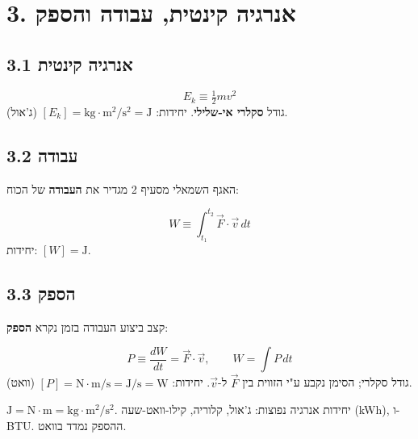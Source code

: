 \documentclass[12pt, a4paper]{article}
\newcommand{\hvec}[1]{\overrightarrow{#1}}
\begin{document}
\section*{3. אנרגיה קינטית, עבודה והספק}

\subsection*{3.1 אנרגיה קינטית}

\begin{tcolorbox}[defbox, title={אנרגיה קינטית (\textenglish{Kinetic Energy})}]
\[
  E_k \equiv \tfrac{1}{2}m v^2
\]
גודל \textbf{סקלרי אי-שלילי}. יחידות: \textenglish{$[E_k] = \text{kg}\cdot\text{m}^2/\text{s}^2 = \text{J}$} (ג'אול).
\end{tcolorbox}

\subsection*{3.2 עבודה}

האגף השמאלי מסעיף 2 מגדיר את \textbf{העבודה} של הכוח:

\begin{tcolorbox}[defbox, title={עבודה (\textenglish{Work})}]
\[
  W \equiv \int_{t_1}^{t_2}\hvec{F}\cdot\hvec{v}\,dt
\]
יחידות: \textenglish{$[W] = \text{J}$}.
\end{tcolorbox}

\subsection*{3.3 הספק}

קצב ביצוע העבודה בזמן נקרא \textbf{הספק}:

\begin{tcolorbox}[defbox, title={הספק (\textenglish{Power})}]
\[
  P \equiv \frac{dW}{dt} = \hvec{F}\cdot\hvec{v},
  \qquad
  W = \int P\,dt
\]
גודל סקלרי; הסימן נקבע ע"י הזווית בין \textenglish{$\hvec{F}$} ל-\textenglish{$\hvec{v}$}. יחידות: \textenglish{$[P] = \text{N}\cdot\text{m}/\text{s} = \text{J}/\text{s} = \text{W}$} (וואט).
\end{tcolorbox}

\begin{tcolorbox}[notebox, title={יחידות}]
\textenglish{$\text{J} = \text{N}\cdot\text{m} = \text{kg}\cdot\text{m}^2/\text{s}^2$}. יחידות אנרגיה נפוצות: ג'אול, קלוריה, קילו-וואט-שעה (\textenglish{kWh}), ו-\textenglish{BTU}. ההספק נמדד בוואט.
\end{tcolorbox}
\end{document}
